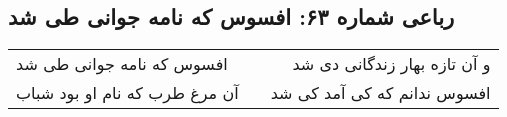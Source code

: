 \begin{center}
\section*{رباعی شماره ۶۳: افسوس که نامه جوانی طی شد}
\label{sec:sh063}
\begin{longtable}{l p{0.5cm} r}
افسوس که نامه جوانی طی شد
&&
و آن تازه بهار زندگانی دی شد
\\
آن مرغ طرب که نام او بود شباب
&&
افسوس ندانم که کی آمد کی شد
\\
\end{longtable}
\end{center}
